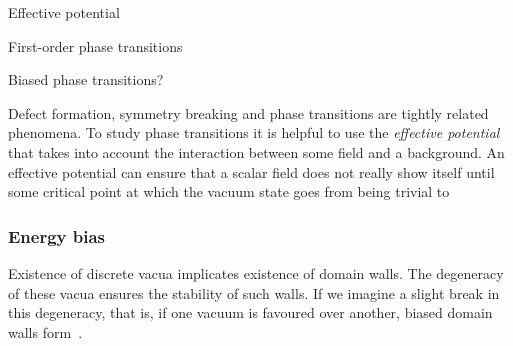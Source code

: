     \begin{bullets}
        \item Effective potential
        \item First-order phase transitions
        \item Biased phase transitions?
    \end{bullets}



    Defect formation, symmetry breaking and phase transitions are tightly related phenomena. 
    To study phase transitions it is helpful to use the \emph{effective potential} that takes into account the interaction between some field and a background. An effective potential can ensure that a scalar field does not really show itself until some critical point at which the vacuum state goes from being trivial to \blahblah



    \subsubsection{Energy bias}
        Existence of discrete vacua implicates existence of domain walls. The degeneracy of these vacua ensures the stability of such walls. If we imagine a slight break in this degeneracy, that is, if one vacuum is favoured over another, biased domain walls form~\citep{vachaspatiKinksDomainWalls2006}. \blahblah







    



    
    




    
